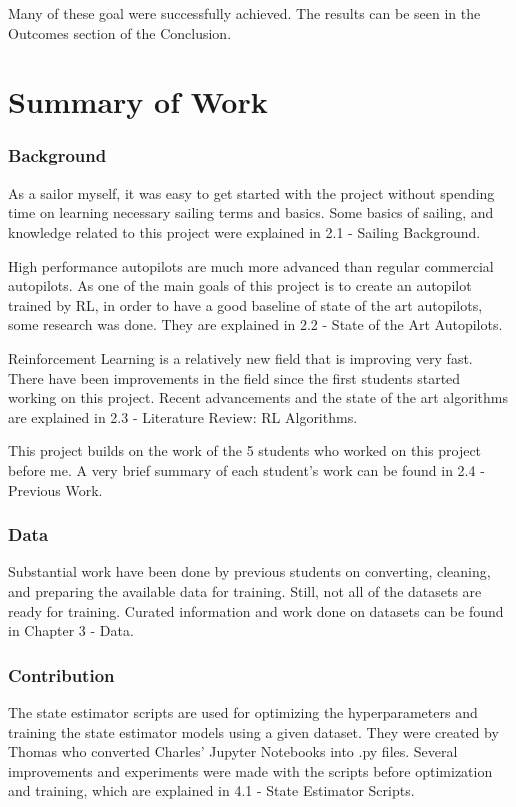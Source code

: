 \documentclass[12pt,twoside]{report}
\begin{document}
\noindent
Many of these goal were successfully achieved. The results can be seen in the Outcomes section of the Conclusion.


\section{Summary of Work}

\subsubsection{Background}
As a sailor myself, it was easy to get started with the project without spending time on learning necessary sailing terms and basics. Some basics of sailing, and knowledge related to this project were explained in 2.1 - Sailing Background. 

High performance autopilots are much more advanced than regular commercial autopilots. As one of the main goals of this project is to create an autopilot trained by RL, in order to have a good baseline of state of the art autopilots, some research was done. They are explained in 2.2 - State of the Art Autopilots.

Reinforcement Learning is a relatively new field that is improving very fast. There have been improvements in the field since the first students started working on this project. Recent advancements and the state of the art algorithms are explained in 2.3 - Literature Review: RL Algorithms.

This project builds on the work of the 5 students who worked on this project before me. A very brief summary of each student's work can be found in 2.4 - Previous Work.

\subsubsection{Data}
Substantial work have been done by previous students on converting, cleaning, and preparing the available data for training. Still, not all of the datasets are ready for training. Curated information and work done on datasets can be found in Chapter 3 - Data.

\subsubsection{Contribution}
The state estimator scripts are used for optimizing the hyperparameters and training the state estimator models using a given dataset. They were created by Thomas who converted Charles' Jupyter Notebooks into .py files. Several improvements and experiments were made with the scripts before optimization and training, which are explained in 4.1 - State Estimator Scripts.
\end{document}
